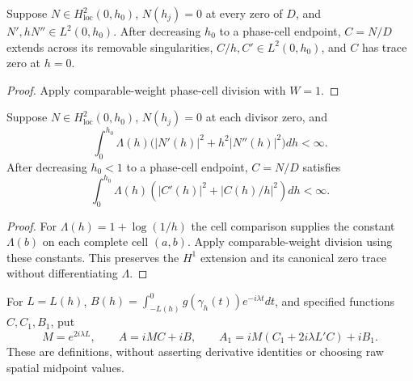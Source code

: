 \begin{lemma}
\label{lem:phase-cell-division}
\leanok
Suppose $N\in H^2_{\mathrm{loc}}(0,h_0)$, $N(h_j)=0$ at every zero
of $D$, and $N',hN''\in L^2(0,h_0)$. After decreasing $h_0$ to a
phase-cell endpoint, $C=N/D$ extends across its removable singularities,
$C/h,C'\in L^2(0,h_0)$, and $C$ has trace zero at $h=0$.
\end{lemma}

\begin{proof}
\leanok
Apply comparable-weight phase-cell division with $W=1$.
\end{proof}

\begin{lemma}
\label{lem:log-phase-cell-division}
\leanok
Suppose $N\in H^2_{\mathrm{loc}}(0,h_0)$, $N(h_j)=0$ at each divisor zero,
and
\[
 \int_0^{h_0}\Lambda(h)\bigl(|N'(h)|^2+h^2|N''(h)|^2\bigr)dh<\infty.
\]
After decreasing $h_0<1$ to a phase-cell endpoint, $C=N/D$ satisfies
\[
 \int_0^{h_0}\Lambda(h)\left(|C'(h)|^2+|C(h)/h|^2\right)dh<\infty.
\]
\end{lemma}

\begin{proof}
\leanok
For $\Lambda(h)=1+\log(1/h)$ the cell comparison supplies the constant
$\Lambda(b)$ on each complete cell $(a,b)$. Apply comparable-weight
division using these constants. This preserves the $H^1$ extension and
its canonical zero trace without differentiating $\Lambda$.
\end{proof}

\begin{definition}
\label{def:quarter-midpoint}
\leanok
For $L=L(h)$, $B(h)=\int_{-L(h)}^0 g(\gamma_h(t))e^{-i\lambda t}dt$,
and specified functions $C,C_1,B_1$, put
\[
 M=e^{2i\lambda L},\qquad A=iMC+iB,\qquad
 A_1=iM(C_1+2i\lambda L'C)+iB_1.
\]
These are definitions, without asserting derivative identities or choosing
raw spatial midpoint values.
\end{definition}

